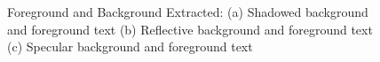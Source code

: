 \begin{figure}[t]
{\label{fig:subfig12}
}
\caption
{Foreground and Background Extracted: (a) Shadowed background and foreground text
(b) Reflective background and foreground text (c) Specular background and foreground text }
\label{fig:extract}
\end{figure}

